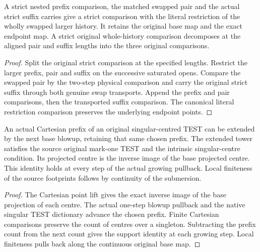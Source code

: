 \begin{proposition}
\label{hir:g8-full-matched-swap-history}
\leanok
A strict nested prefix comparison, the matched swapped pair and the
actual strict suffix carries give a strict comparison with the literal
restriction of the wholly swapped larger history. It retains the
original base map and the exact endpoint map. A strict original
whole-history comparison decomposes at the aligned pair and suffix
lengths into the three original comparisons.
\end{proposition}
\begin{proof}
Split the original strict comparison at the specified lengths.
Restrict the larger prefix, pair and suffix on the successive
saturated opens. Compare the swapped pair by the two-step physical
comparison and carry the original strict suffix through both genuine
swap transports. Append the prefix and pair comparisons, then the
transported suffix comparison. The canonical literal restriction
comparison preserves the underlying endpoint points.
\end{proof}

\begin{theorem}
\label{hir:g8-cartesian-singular-prefix}
\leanok
An actual Cartesian prefix of an original singular-centred TEST can
be extended by the next base blowup, retaining that same chosen
prefix. The extended tower satisfies the source original mark-one
TEST and the intrinsic singular-centre condition. Its projected
centre is the inverse image of the base projected centre. This
identity holds at every step of the actual growing pullback.
Local finiteness of the source footprints follows by continuity of
the submersion.
\end{theorem}
\begin{proof}
The Cartesian point lift gives the exact inverse image of the base
projection of each centre. The actual one-step blowup pullback and
the native singular TEST dictionary advance the chosen prefix.
Finite Cartesian comparisons preserve the count of centres over a
singleton. Subtracting the prefix count from the next count gives
the support identity at each growing step. Local finiteness pulls
back along the continuous original base map.
\end{proof}

